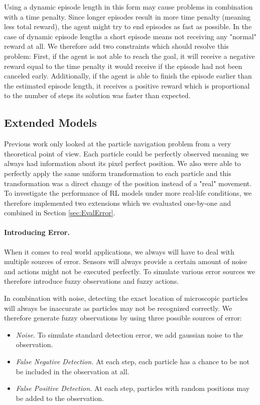 Using a dynamic episode length in this form may cause problems in combination with a time penalty. Since longer episodes result in more time penalty (meaning less total reward), the agent might try to end episodes as fast as possible. In the case of dynamic episode lengths a short episode means not receiving any "normal" reward at all. We therefore add two constraints which should resolve this problem: First, if the agent is not able to reach the goal, it will receive a negative reward equal to the time penalty it would receive if the episode had not been canceled early. Additionally, if the agent is able to finish the episode earlier than the estimated episode length, it receives a positive reward which is proportional to the number of steps its solution was faster than expected.

\subsection{Extended Models} \label{sec:ExtendedMaze}
Previous work only looked at the particle navigation problem from a very theoretical point of view. Each particle could be perfectly observed meaning we always had information about its pixel perfect position. We also were able to perfectly apply the same uniform transformation to each particle and this transformation was a direct change of the position instead of a "real" movement. To investigate the performance of RL models under more real-life conditions, we therefore implemented two extensions which we evaluated one-by-one and combined in Section \ref{sec:EvalError}.

\paragraph{Introducing Error.}
When it comes to real world applications, we always will have to deal with multiple sources of error. Sensors will always provide a certain amount of noise and actions might not be executed perfectly. To simulate various error sources we therefore introduce fuzzy observations and fuzzy actions.  

In combination with noise, detecting the exact location of microscopic particles will always be inaccurate as particles may not be recognized correctly. We therefore generate fuzzy observations by using three possible sources of error:

\begin{itemize}
    \item \textit{Noise.} To simulate standard detection error, we add gaussian noise to the observation.
    \item \textit{False Negative Detection.} At each step, each particle has a chance to be not be included in the observation at all.
    \item \textit{False Positive Detection.} At each step, particles with random positions may be added to the observation.
\end{itemize}


